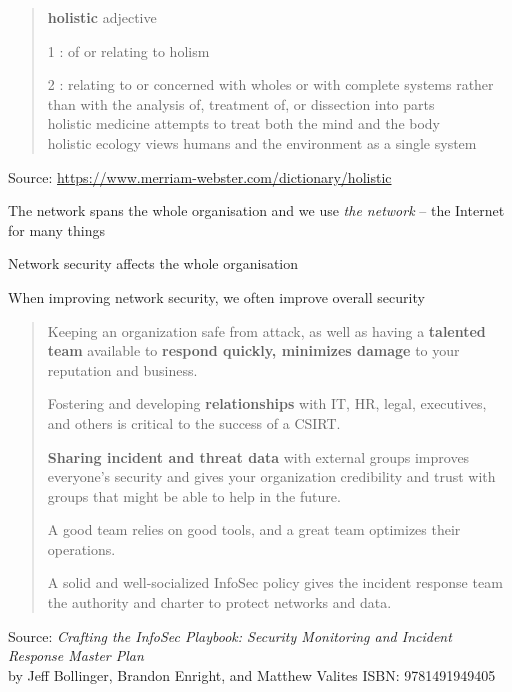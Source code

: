 \documentclass[Screen16to9,17pt]{foils}
\begin{document}
\begin{quote}
{\bf\Large holistic} adjective

\begin{list2}
\item[1]: of or relating to holism
\item[2] : relating to or concerned with wholes or with complete systems rather than with the analysis of, treatment of, or dissection into parts\\
holistic medicine attempts to treat both the mind and the body\\
holistic ecology views humans and the environment as a single system
\end{list2}
\end{quote}
Source: \url{https://www.merriam-webster.com/dictionary/holistic}

\begin{list2}
\item The network spans the whole organisation and we use \emph{the network} -- the Internet for many things
\item Network security affects the whole organisation
\item When improving network security, we often improve overall security
\end{list2}




\begin{quote}
\begin{list2}
\item Keeping an organization safe from attack, as well as having a {\bf talented team} available to {\bf respond quickly, minimizes damage} to your reputation and business.
\item Fostering and developing {\bf relationships} with IT, HR, legal, executives, and others is critical to the success of a CSIRT.
\item {\bf Sharing incident and threat data} with external groups improves everyone’s security and gives your organization credibility and trust with groups that might be able to help in the future.
\item A good team relies on good tools, and a great team optimizes their operations.
\item A solid and well-socialized InfoSec policy gives the incident response team the authority and charter to protect networks and data.
\end{list2}
\end{quote}
Source:
 \emph{Crafting the InfoSec Playbook: Security Monitoring and Incident Response Master Plan}\\
 by Jeff Bollinger, Brandon Enright, and Matthew Valites ISBN: 9781491949405
\end{document}
